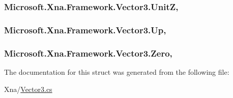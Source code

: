 \subsubsection[{Unit\+Z}]{ Microsoft.\+Xna.\+Framework.\+Vector3.\+Unit\+Z\hspace{0.3cm}{\ttfamily [static]}, {\ttfamily [get]}}\label{struct_microsoft_1_1_xna_1_1_framework_1_1_vector3_a0e14b3e9b1ef50553b7bdfaee0fabf91}
\hypertarget{struct_microsoft_1_1_xna_1_1_framework_1_1_vector3_aa8d2d66950df7aceb4a717afe72f5bcc}{}
\subsubsection[{Up}]{ Microsoft.\+Xna.\+Framework.\+Vector3.\+Up\hspace{0.3cm}{\ttfamily [static]}, {\ttfamily [get]}}\label{struct_microsoft_1_1_xna_1_1_framework_1_1_vector3_aa8d2d66950df7aceb4a717afe72f5bcc}
\hypertarget{struct_microsoft_1_1_xna_1_1_framework_1_1_vector3_a10445e6927ede9b886a5e486fd975370}{}
\subsubsection[{Zero}]{ Microsoft.\+Xna.\+Framework.\+Vector3.\+Zero\hspace{0.3cm}{\ttfamily [static]}, {\ttfamily [get]}}\label{struct_microsoft_1_1_xna_1_1_framework_1_1_vector3_a10445e6927ede9b886a5e486fd975370}


The documentation for this struct was generated from the following file\+:\begin{DoxyCompactItemize}
\item 
Xna/\hyperlink{_vector3_8cs}{Vector3.\+cs}\end{DoxyCompactItemize}

